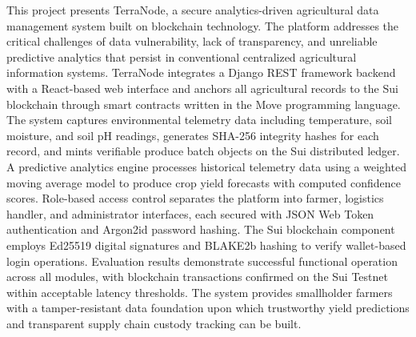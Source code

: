 \documentclass[12pt,a4paper]{report}
\begin{document}
This project presents TerraNode, a secure analytics-driven agricultural data management system built on blockchain technology. The platform addresses the critical challenges of data vulnerability, lack of transparency, and unreliable predictive analytics that persist in conventional centralized agricultural information systems. TerraNode integrates a Django REST framework backend with a React-based web interface and anchors all agricultural records to the Sui blockchain through smart contracts written in the Move programming language. The system captures environmental telemetry data including temperature, soil moisture, and soil pH readings, generates SHA-256 integrity hashes for each record, and mints verifiable produce batch objects on the Sui distributed ledger. A predictive analytics engine processes historical telemetry data using a weighted moving average model to produce crop yield forecasts with computed confidence scores. Role-based access control separates the platform into farmer, logistics handler, and administrator interfaces, each secured with JSON Web Token authentication and Argon2id password hashing. The Sui blockchain component employs Ed25519 digital signatures and BLAKE2b hashing to verify wallet-based login operations. Evaluation results demonstrate successful functional operation across all modules, with blockchain transactions confirmed on the Sui Testnet within acceptable latency thresholds. The system provides smallholder farmers with a tamper-resistant data foundation upon which trustworthy yield predictions and transparent supply chain custody tracking can be built.

\newpage
\onehalfspacing
\tableofcontents
\newpage
\listoftables
\newpage
\listoffigures
\newpage

\doublespacing







\newpage
\singlespacing
\printbibliography
\end{document}
